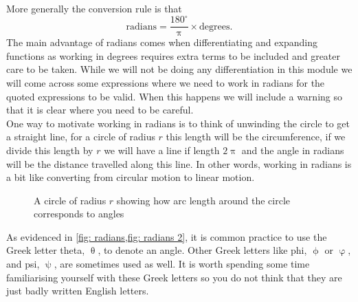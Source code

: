 \documentclass[a4paper,12pt]{book}
\begin{document}
More generally the conversion rule is that
\begin{equation*}
\text{radians} = \frac{180^{\circ}}{\uppi}\times \text{degrees}.
\end{equation*}
The main advantage of radians comes when differentiating and expanding functions as working in degrees requires extra terms to be included and greater care to be taken. While we will not be doing any differentiation in this module we will come across some expressions where we need to work in radians for the quoted expressions to be valid. When this happens we will include a warning so that it is clear where you need to be careful.\\

One way to motivate working in radians is to think of unwinding the circle to get a straight line, for a circle of radius $r$ this length will be the circumference, if we divide this length by $r$ we will have a line if length $2\uppi$ and the angle in radians will be the distance travelled along this line. In other words, working in radians is a bit like converting from circular motion to linear motion.

\begin{figure}[ht]
    \centering
    \caption{A circle of radius $r$ showing how arc length around the circle corresponds to angles}
        \label{fig: radians 2}
\end{figure}

As evidenced in \cref{fig: radians,fig: radians 2}, it is common practice to use the Greek letter theta, $\uptheta$, to denote an angle. Other Greek letters like phi, $\upphi$ or $\upvarphi$, and psi, $\uppsi$, are sometimes used as well. It is worth spending some time familiarising yourself with these Greek letters so you do not think that they are just badly written English letters.
\end{document}
